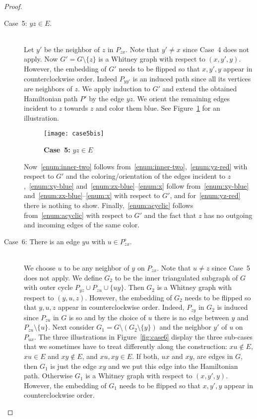\documentclass[a4paper,10pt]{article}
\theoremstyle{plain}
\newcommand{\inner}[1]{{#1}^{\circ}}
\begin{document}
\begin{proof}
\begin{description}
  \item[Case~5: $yz \in E$.]{\ \\}  
   Let $y'$ be the neighbor of $z$ in $P_{zx}$. Note that $y' \neq x$ since Case~4 does not apply. Now $G' = G \setminus \{z\}$ is a Whitney graph with respect to $(x,y',y)$. However, the embedding of $G'$ needs to be flipped so that $x,y',y$ appear in counterclockwise order. Indeed $P_{yy'}$ is an induced path since all its vertices are neighbors of $z$. We apply induction to $G'$ and extend the obtained Hamiltonian path $P'$ by the  edge $yz$. We orient the remaining edges incident to $z$ towards $z$ and color them blue. 
   See Figure~\ref{fig:case5} for an illustration.
 
   \begin{figure}[tb]
    \centering
    \texttt{[image: case5bis]}
    \caption{\textbf{Case~5:} $yz \in E$}
    \label{fig:case5}
   \end{figure}
 
   Now~\ref{enum:inner-two} follows from~\ref{enum:inner-two},~\ref{enum:yz-red} with respect to $G'$ and the coloring/orientation of the edges incident to $z$,~\ref{enum:xy-blue} and~\ref{enum:zx-blue}--\ref{enum:x} follow from~\ref{enum:xy-blue} and~\ref{enum:zx-blue}--\ref{enum:x} with respect to $G'$, and for~\ref{enum:yz-red} there is nothing to show. Finally,~\ref{enum:acyclic} follows from~\ref{enum:acyclic} with respect to $G'$ and the fact that $z$ has no outgoing and incoming edges of the same color.
   
  \item[Case~6: There is an edge $yu$ with $u \in \inner{P}_{zx}$.]{\ \\}  
   We choose $u$ to be any neighbor of $y$ on $P_{zx}$. Note that $u \neq z$ since Case~5 does not apply. We define $G_2$ to be the inner triangulated subgraph of $G$ with outer cycle $P_{yz} \cup P_{zu} \cup \{uy\}$. Then $G_2$ is a Whitney graph with respect to $(y,u,z)$. However, the embedding of $G_2$ needs to be flipped so that $y,u,z$ appear in counterclockwise order. Indeed, $P_{zy}$ in $G_2$ is induced since $P_{zu}$ in $G$ is so and by the choice of $u$ there is no edge between $y$ and $P_{zu} \setminus \{u\}$. Next consider $G_1 = G \setminus (G_2 \setminus \{y\})$ and the neighbor $y'$ of $u$ on $P_{ux}$. The three illustrations in Figure~\ref{fig:case6} display the three sub-cases that we sometimes have to treat differently along the construction: $xu\notin E$,  $xu\in E$ and $xy\notin E$, and $xu,xy\in E$. If both, $ux$ and $xy$, are edges in $G$, then $G_1$ is just the edge $xy$ and we put this edge into the Hamiltonian path. Otherwise $G_1$ is a Whitney graph with respect to $(x,y',y)$. However, the embedding of $G_1$ needs to be flipped so that $x,y',y$ appear in counterclockwise order.
 

\end{description}
\end{proof}
\end{document}
